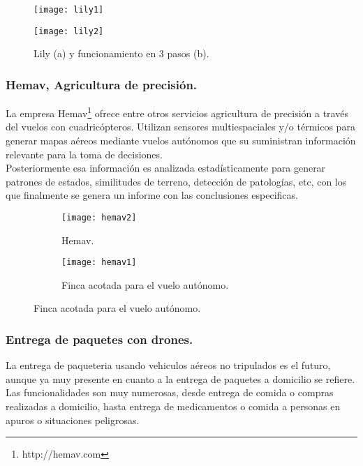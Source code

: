 \begin{figure}[htb]
\centering
\texttt{[image: lily1]}
\end{figure}

\begin{figure}[htb]
\centering
\texttt{[image: lily2]}
\caption{Lily (a) y funcionamiento en 3 pasos (b).}
\label{fig:lily}
\end{figure}


\subsubsection{Hemav, Agricultura de precisión.}

La empresa Hemav\footnote{http://hemav.com} ofrece entre otros servicios agricultura de precisión a través del vuelos con cuadricópteros. Utilizan sensores multiespaciales y/o térmicos para generar mapas aéreos mediante vuelos autónomos que su suministran información relevante para la toma de decisiones.\\

Posteriormente esa información es analizada estadísticamente para generar patrones de estados, similitudes de terreno, detección de patologías, etc, con los que finalmente se genera un informe con las conclusiones especificas.\\

\begin{figure}[h]
\centering
  \begin{subfigure}[]{60mm}
    \texttt{[image: hemav2]}
    \caption{Hemav.} 
  \end{subfigure}
  \hspace{5pt}
  \begin{subfigure}[]{60mm}
    \texttt{[image: hemav1]}
    \caption{Finca acotada para el vuelo autónomo.}
  \end{subfigure}
  \label{fig:hemav}
\end{figure}


\subsubsection{Entrega de paquetes con drones.}

La entrega de paqueteria usando vehiculos aéreos no tripulados es el futuro, aunque ya muy presente en cuanto a la entrega de paquetes a domicilio se refiere. Las funcionalidades son muy numerosas, desde entrega de comida o compras realizadas a domicilio, hasta entrega de medicamentos o comida a personas en apuros o situaciones peligrosas.\\

